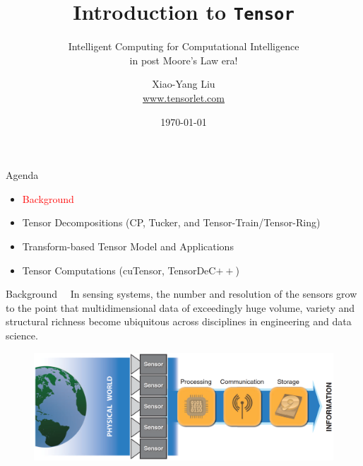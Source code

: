 \documentclass[t, 10pt, handout, aspectratio=169]{beamer}
\title[Introduction to Tensor]{Introduction to \texttt{Tensor}}
\subtitle{Intelligent Computing for Computational Intelligence \\
in post Moore’s Law era!}
\author[yanglet]{Xiao-Yang Liu\\
\url{www.tensorlet.com}}
\institute[CU]{Columbia University}
\date[\number\month/\number\day/\number\year]{\today}
\begin{document}
\begin{frame}
  \titlepage
\end{frame}

\begin{frame}{Agenda}
\begin{itemize}
    \large \item \textcolor{red}{Background}
    \large \item {Tensor Decompositions (CP, Tucker, and Tensor-Train/Tensor-Ring)}
    \large \item{Transform-based Tensor Model and Applications}
    \large \item{Tensor Computations (cuTensor, TensorDeC$++$)}
\end{itemize}
\end{frame}

\begin{frame}{Background}
~~In sensing systems, the number and resolution of the sensors grow to the point that multidimensional data of exceedingly huge volume, variety and structural richness become ubiquitous across disciplines in engineering and data science.
\begin{figure}
	\centering  
	\includegraphics[width=\linewidth]{figs/data_deluge.png}
	\label{fig:data_deluge}
\end{figure}
\end{frame}
\end{document}

